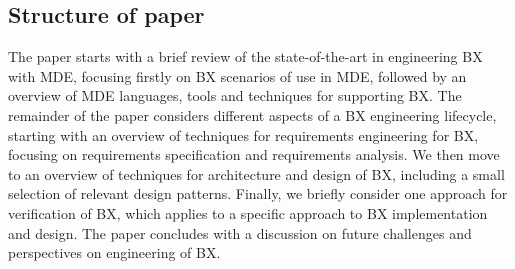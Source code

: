 \subsection{Structure of paper}
The paper starts with a brief review of the state-of-the-art in engineering BX with MDE, focusing firstly on BX scenarios of use in MDE, followed by an overview of MDE languages, tools and techniques for supporting BX. The remainder of the paper considers different aspects of a BX engineering lifecycle, starting with an overview of techniques for requirements engineering for BX, focusing on requirements specification and requirements analysis. We then move to an overview of techniques for architecture and design of BX, including a small selection of relevant design patterns. Finally, we briefly consider one approach for verification of BX, which applies to a specific approach to BX implementation and design. The paper concludes with a discussion on future challenges and perspectives on engineering of BX.

